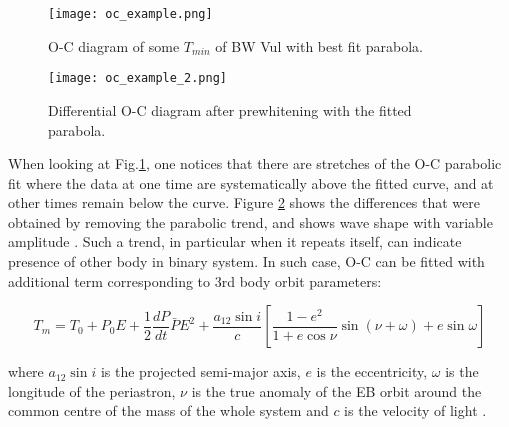 \begin{figure}[!ht]
\vspace{0cm}
\centerline{\texttt{[image: oc\_example.png]}}
\caption{O-C diagram of some $T_{min}$ of BW Vul with best fit parabola. \citep{Sterken2005basic}}
\label{fig_oc}
\end{figure}

\begin{figure}[!ht]
\vspace{0cm}
\centerline{\texttt{[image: oc\_example\_2.png]}}
\caption{Differential O-C diagram after prewhitening with the fitted parabola. \citep{Sterken2005basic}}
\label{fig_oc2}
\end{figure}

When looking at Fig.\ref{fig_oc}, one notices that there are stretches of the O-C parabolic
fit where the data at one time are systematically above the fitted curve, and at
other times remain below the curve. Figure \ref{fig_oc2} shows the differences that were
obtained by removing the parabolic trend, and shows wave shape with
variable amplitude \citep{Sterken2005basic}. Such a trend, in particular when it repeats itself, 
can indicate presence of other body in binary system. 
In such case, O-C can be fitted with additional term corresponding to 3rd body orbit parameters:  

\begin{equation} \label{eq:P_lin_OC_sin}
T_{m} = T_{0} + P_{0}E + \frac{1}{2} \frac{dP}{dt} \bar{P}E^{2} +
\dfrac{a_{12}\sin i}{c}   \left[  \dfrac{1-e^2}{1+e \cos\nu}   \sin(\nu + \omega)  + e \sin \omega  \right]
\end{equation} 
 

%
where $a_{12} \sin i$ is the projected semi-major axis, $e$ is the eccentricity,
$\omega$ is the longitude of the periastron, $\nu$ is the true anomaly of the EB orbit around the common centre of the mass of
the whole system and $c$ is the velocity of light \citep{irwin1959}.
